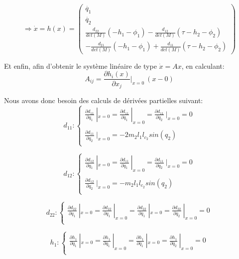 \documentclass[a4paper,12pt]{report}
\begin{document}
$$
    \Rightarrow
    \dot{x}
    =
    h(x)
    =
    \begin{pmatrix}
    \dot{q_1} \\
    \dot{q_2} \\
    \frac{d_{22}}{det(M)}(-h_1 - \phi_1) - \frac{d_{12}}{det(M)}(\tau -h_2 - \phi_2) \\
    -\frac{d_{21}}{det(M)}(-h_1 - \phi_1) + \frac{d_{11}}{det(M)} (\tau -h_2 - \phi_2)
    \end{pmatrix}
$$


Et enfin, afin d'obtenir le système linéaire de type $\dot{x}=Ax$, en calculant:
$$A_{ij} = \frac{\partial h_i(x)}{\partial{x_j}}|_{x=0} \ (x-0)$$

Nous avons donc besoin des calculs de dérivées partielles suivant:
$$
d_{11} : \left\{
    \begin{array}{ll}
	\frac{\partial d_{11}}{\partial q_1}\ |_{x=0} = \frac{\partial d_{11}}{\partial \dot{q_1}}\ |_{x=0} = \frac{\partial d_{11}}{\partial \dot{q_2}}\ |_{x=0} = 0 \\
	\ \\
	\frac{\partial d_{11}}{\partial q_2}\ |_{x=0} = -2m_2l_1l_{c_2}sin(q_2)\\
    \end{array}
\right.
$$

$$
d_{12} : \left\{
    \begin{array}{ll}
	\frac{\partial d_{12}}{\partial q_1}\ |_{x=0} = \frac{\partial d_{11}}{\partial \dot{q_1}}\ |_{x=0} = \frac{\partial d_{11}}{\partial \dot{q_2}}\ |_{x=0} = 0 \\
	\ \\
	\frac{\partial d_{12}}{\partial q_2}\ |_{x=0} = -m_2l_1l_{c_2}sin(q_2)\\
    \end{array}
\right.
$$

$$
d_{22} : \left\{
    \begin{array}{ll}
	\frac{\partial d_{22}}{\partial q_1}\ |_{x=0} = \frac{\partial d_{22}}{\partial q_1}\ |_{x=0} = \frac{\partial d_{22}}{\partial \dot{q_1}}\ |_{x=0} = \frac{\partial d_{22}}{\partial \dot{q_2}}\ |_{x=0} = 0 \\
    \end{array}
\right.
$$

$$
h_1 : \left\{
    \begin{array}{ll}
	\frac{\partial h_1}{\partial q_1}\ |_{x=0} = \frac{\partial h_1}{\partial q_1}\ |_{x=0} = \frac{\partial h_1}{\partial \dot{q_1}}\ |_{x=0} = \frac{\partial h_1}{\partial \dot{q_2}}\ |_{x=0} = 0 \\
    \end{array}
\right.
$$
\end{document}
